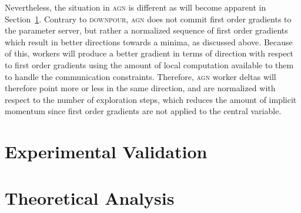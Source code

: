 Nevertheless, the situation in \textsc{agn} is different as will become apparent in Section~\ref{sec:agn_experimental_validation}. Contrary to \textsc{downpour}, \textsc{agn} does not commit first order gradients to the parameter server, but rather a normalized sequence of first order gradients which result in better directions towards a minima, as discussed above. Because of this, workers will produce a better gradient in terms of direction with respect to first order gradients using the amount of local computation available to them to handle the communication constraints. Therefore, \textsc{agn} worker deltas will therefore point more or less in the same direction, and are normalized with respect to the number of exploration steps, which reduces the amount of implicit momentum since first order gradients are not applied to the central variable.

\section{Experimental Validation}
\label{sec:agn_experimental_validation}

\section{Theoretical Analysis}
\label{sec:agn_theoretical_analysis}
